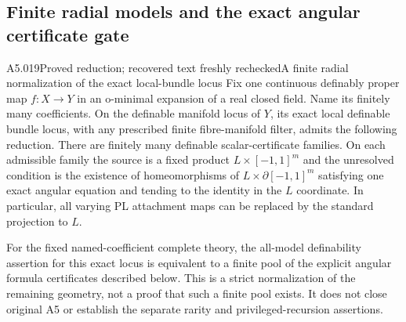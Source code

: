 \subsection{Finite radial models and the exact angular certificate gate}

\begin{saresult}{A5.019}{Proved reduction; recovered text freshly rechecked}{A finite radial normalization of the exact local-bundle locus}
Fix one continuous definably proper map $f:X\to Y$ in an o-minimal
expansion of a real closed field. Name its finitely many coefficients.
On the definable manifold locus of $Y$, its exact local definable bundle
locus, with any prescribed finite fibre-manifold filter, admits the
following reduction. There are finitely many definable scalar-certificate
families. On each admissible family the source is a fixed product
$L\times[-1,1]^m$ and the unresolved condition is the existence of
homeomorphisms of $L\times\partial[-1,1]^m$ satisfying one exact angular
equation and tending to the identity in the $L$ coordinate. In particular,
all varying PL attachment maps can be replaced by the standard projection
to $L$.

For the fixed named-coefficient complete theory, the all-model definability
assertion for this exact locus is equivalent to a finite pool of the
explicit angular formula certificates described below. This is a strict
normalization of the remaining geometry, not a proof that such a finite
pool exists. It does not close original A5 or establish the separate
rarity and privileged-recursion assertions.
\end{saresult}

